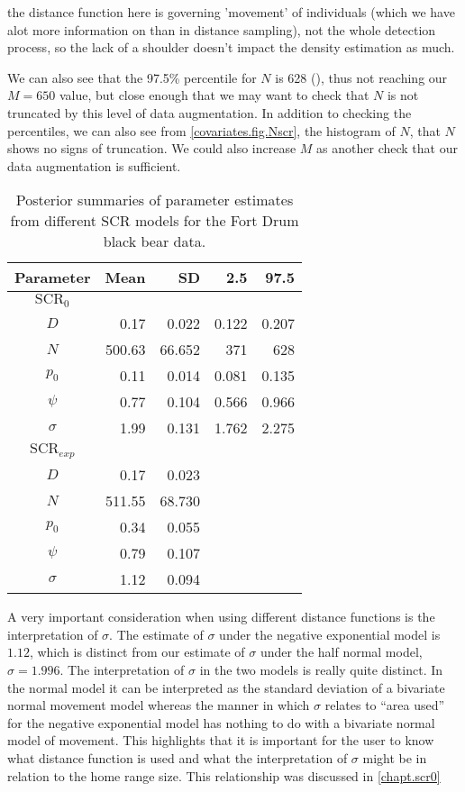 the distance function here is governing 'movement' of individuals (which we have alot more information on than in distance sampling), not the whole detection process, so the lack of a shoulder doesn't impact the density estimation as much.   

We can also see that the 97.5\%
percentile for $N$ is 628 (\label{covariates.tab.SCR0exp}), thus not reaching our $M=650$ value, but
close enough that we may want to check that $N$ is not truncated by
this level of data augmentation.  In addition to checking the percentiles, 
we can also see from \ref{covariates.fig.Nscr}, the histogram of $N$, that $N$ 
shows no signs of truncation.  We could also increase
$M$ as another check that our data augmentation is sufficient.  

\begin{table}[ht]
\centering
\caption{Posterior summaries of parameter estimates from different SCR models for the Fort Drum black bear data.}
\begin{tabular}{crrrr}
\hline \hline
Parameter & Mean & SD & 2.5 & 97.5 \\
\hline

$\mbox{SCR}_0$&   &      &           &        \\
\hline
$D$    &   0.17   & 0.022     &  0.122 & 0.207  \\
$N$    &  500.63 & 66.652  & 371   & 628       \\
$p_0$  &    0.11  & 0.014   & 0.081& 0.135     \\
$\psi$  &   0.77  & 0.104    & 0.566 & 0.966    \\
$\sigma$ &  1.99 & 0.131  &1.762 & 2.275     \\

$\mbox{SCR}_{exp}$&   &      &          &        \\
\hline
$D$  &   0.17 &  0.023  &				& 		 \\
$N$   &  511.55 &  68.730  &			& 		 \\
$p_0$  &    0.34 &   0.055  &			& 		 \\
$\psi$  &   0.79  &  0.107  &			& 		 \\
$\sigma$ &  1.12  & 0.094  &			& 		 \\
\end{tabular}
\label{covariates.tab.SCR0exp}
\end{table}

A very important consideration when using different distance functions is the
interpretation of $\sigma$.  The estimate of $\sigma$ under the negative exponential model is
$1.12$, which is distinct from our
estimate of $\sigma$ under the half normal model, $\sigma = 1.996$.
The interpretation
of $\sigma$ in the two models is really quite distinct. In the normal
model it can be interpreted as the standard deviation of a bivariate
normal movement model whereas the manner in which $\sigma$ relates to
``area used'' for the negative exponential model has nothing to do
with a bivariate normal model of movement.  This highlights that it is
important for the user to know what distance function is used and what
the interpretation of $\sigma$ might be in relation to the home range size.
This relationship was discussed in \ref{chapt.scr0}

